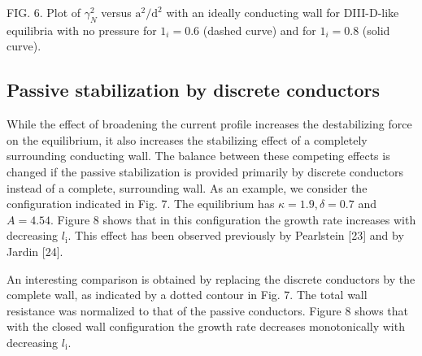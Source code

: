 \documentclass[10pt]{article}
\begin{document}
FIG. 6. Plot of $\gamma_{N}^{2}$ versus $\mathrm{a}^{2} / \mathrm{d}^{2}$ with an ideally conducting wall for DIII-D-like equilibria with no pressure for $1_{i}=0.6$ (dashed curve) and for $1_{i}=0.8$ (solid curve).

\subsection{Passive stabilization by discrete conductors}
While the effect of broadening the current profile increases the destabilizing force on the equilibrium, it also increases the stabilizing effect of a completely surrounding conducting wall. The balance between these competing effects is changed if the passive stabilization is provided primarily by discrete conductors instead of a complete, surrounding wall. As an example, we consider the configuration indicated in Fig. 7. The equilibrium has $\kappa=1.9, \delta=0.7$ and $A=4.54$. Figure 8 shows that in this configuration the growth rate increases with decreasing $l_{\mathrm{i}}$. This effect has been observed previously by Pearlstein [23] and by Jardin [24].

An interesting comparison is obtained by replacing the discrete conductors by the complete wall, as indicated by a dotted contour in Fig. 7. The total wall resistance was normalized to that of the passive conductors. Figure 8 shows that with the closed wall configuration the growth rate decreases monotonically with decreasing $l_{\mathrm{i}}$.
\end{document}
